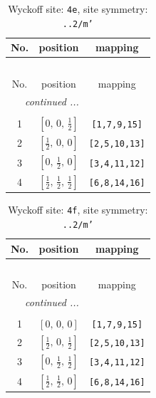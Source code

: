 \documentclass[fleqn,8pt]{jsarticle}
\begin{document}
\renewcommand{\arraystretch}{1.2}
\begin{longtable}{ccc}
\caption{Wyckoff site: {\tt 4e}, site symmetry: {\tt ..2/m'}}
 \\
 \hline \hline
No. & position & mapping \\ \hline \endfirsthead

\multicolumn{2}{l}{\tablename\ \thetable{}} \\
 \hline \hline
No. & position & mapping \\ \hline \endhead

 \hline \hline
\multicolumn{2}{r}{\footnotesize\it continued ...} \\ \endfoot

 \hline \hline
\multicolumn{2}{r}{} \\ \endlastfoot

1 & $\left[ 0,\, 0,\, \frac{1}{2} \right]$ & {\tt [1,7,9,15]} \\ \hline
2 & $\left[ \frac{1}{2},\, 0,\, 0 \right]$ & {\tt [2,5,10,13]} \\ \hline
3 & $\left[ 0,\, \frac{1}{2},\, 0 \right]$ & {\tt [3,4,11,12]} \\ \hline
4 & $\left[ \frac{1}{2},\, \frac{1}{2},\, \frac{1}{2} \right]$ & {\tt [6,8,14,16]} \\
\end{longtable}
\renewcommand{\arraystretch}{1.2}
\begin{longtable}{ccc}
\caption{Wyckoff site: {\tt 4f}, site symmetry: {\tt ..2/m'}}
 \\
 \hline \hline
No. & position & mapping \\ \hline \endfirsthead

\multicolumn{2}{l}{\tablename\ \thetable{}} \\
 \hline \hline
No. & position & mapping \\ \hline \endhead

 \hline \hline
\multicolumn{2}{r}{\footnotesize\it continued ...} \\ \endfoot

 \hline \hline
\multicolumn{2}{r}{} \\ \endlastfoot

1 & $\left[ 0,\, 0,\, 0 \right]$ & {\tt [1,7,9,15]} \\ \hline
2 & $\left[ \frac{1}{2},\, 0,\, \frac{1}{2} \right]$ & {\tt [2,5,10,13]} \\ \hline
3 & $\left[ 0,\, \frac{1}{2},\, \frac{1}{2} \right]$ & {\tt [3,4,11,12]} \\ \hline
4 & $\left[ \frac{1}{2},\, \frac{1}{2},\, 0 \right]$ & {\tt [6,8,14,16]} \\
\end{longtable}
\end{document}
